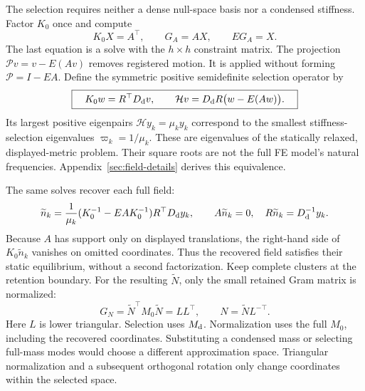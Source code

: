 The selection requires neither a dense null-space basis nor a condensed
stiffness. Factor $K_0$ once and compute
\[
 K_0X=A^{\top},\qquad G_A=AX,\qquad EG_A=X.
\]
The last equation is a solve with the $h\times h$ constraint matrix.
The projection $\mathcal Pv=v-E(Av)$ removes registered motion. It is applied
without forming $\mathcal P=I-EA$. Define the symmetric positive semidefinite
selection operator by
\begin{equation}
 \boxed{\quad K_0w=R^{\top}D_{\rm d}v,\qquad
 \mathcal Hv=D_{\rm d}R\bigl(w-E(Aw)\bigr).\quad}
 \label{eq:selection-action}
\end{equation}
Its largest positive eigenpairs $\mathcal Hy_k=\mu_ky_k$ correspond to the
smallest stiffness-selection eigenvalues $\varpi_k=1/\mu_k$.
These are eigenvalues of the statically relaxed, displayed-metric problem.
Their square roots are not the full FE model's natural frequencies.
Appendix~\ref{sec:field-details} derives this equivalence.

The same solves recover each full field:
\begin{equation}
 \widetilde n_k=\frac1{\mu_k}
 (K_0^{-1}-EAK_0^{-1})R^{\top}D_{\rm d}y_k,
 \qquad A\widetilde n_k=0,\quad
 R\widetilde n_k=D_{\rm d}^{-1}y_k.
 \label{eq:field-recovery}
\end{equation}
Because $A$ has support only on displayed translations, the right-hand
side of $K_0\widetilde n_k$ vanishes on omitted coordinates. Thus the
recovered field satisfies their static equilibrium, without a second
factorization. Keep complete clusters at the retention boundary.
For the resulting $\widetilde N$, only the small retained Gram matrix is
normalized:
\begin{equation}
 G_N=\widetilde N^{\top}M_0\widetilde N=LL^{\top},\qquad
 N=\widetilde NL^{-\top}.
 \label{eq:retained-normalization}
\end{equation}
Here $L$ is lower triangular. Selection uses $M_{\rm d}$. Normalization uses
the full $M_0$, including the recovered coordinates. Substituting a condensed
mass or selecting full-mass modes would choose a different approximation
space. Triangular normalization and a subsequent orthogonal rotation only
change coordinates within the selected space.

